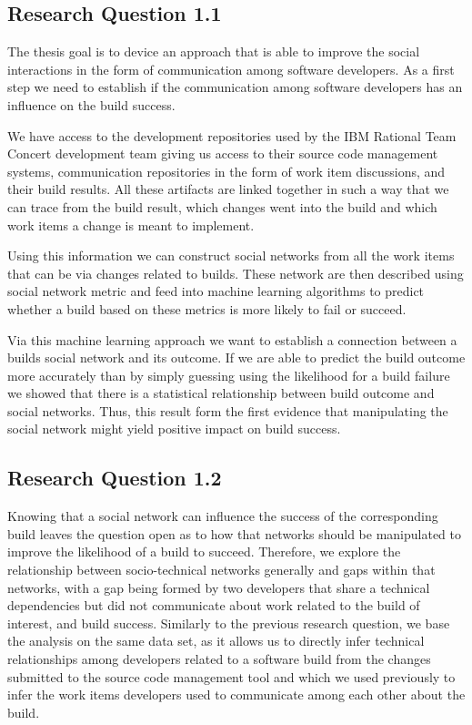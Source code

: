 \subsection{Research Question 1.1}
The thesis goal is to device an approach that is able to improve the social interactions in the form of communication among software developers.
As a first step we need to establish if the communication among software developers has an influence on the build success.

We have access to the development repositories used by the IBM Rational Team Concert development team giving us access to their source code management systems, communication repositories in the form of work item discussions, and their build results.
All these artifacts are linked together in such a way that we can trace from the build result, which changes  went into the build and which work items a change is meant to implement.

Using this information we can construct social networks from all the work items that can be via changes related to builds.
These network are then described using social network metric and feed into machine learning algorithms to predict whether a build based on these metrics is more likely to fail or succeed.

Via this machine learning approach we want to establish a connection between a builds social network and its outcome. 
If we are able to predict the build outcome more accurately than by simply guessing using the likelihood for a build failure we showed that there is a statistical relationship between build outcome and social networks.
Thus, this result form the first evidence that manipulating the social network might yield positive impact on build success.

\subsection{Research Question 1.2}
Knowing that a social network can influence the success of the corresponding build leaves the question open as to how that networks should be manipulated to improve the likelihood of a build to succeed.
Therefore, we explore the relationship between socio-technical networks generally and gaps within that networks, with a gap being formed by two developers that share a technical dependencies but did not communicate about work related to the build of interest, and build success.
Similarly to the previous research question, we base the analysis on the same data set, as it allows us to directly infer technical relationships among developers related to a software build from the changes submitted to the source code management tool and which we used previously to infer the work items developers used to communicate among each other about the build.

